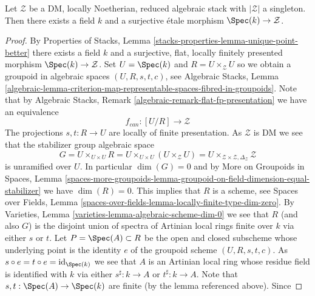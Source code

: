 %
\begin{lemma}
\label{lemma-DM-residual-gerbe}
Let $\mathcal{Z}$ be a DM, locally Noetherian, reduced algebraic stack
with $|\mathcal{Z}|$ a singleton. Then there exists a field $k$ and
a surjective \'etale morphism $\Spec(k) \to \mathcal{Z}$.
\end{lemma}

\begin{proof}
By
Properties of Stacks, Lemma \ref{stacks-properties-lemma-unique-point-better}
there exists a field $k$ and a surjective, flat, locally finitely presented
morphism $\Spec(k) \to \mathcal{Z}$. Set $U = \Spec(k)$ and
$R = U \times_\mathcal{Z} U$ so we obtain a groupoid in algebraic spaces
$(U, R, s, t, c)$, see
Algebraic Stacks, Lemma
\ref{algebraic-lemma-criterion-map-representable-spaces-fibred-in-groupoids}.
Note that by
Algebraic Stacks, Remark \ref{algebraic-remark-flat-fp-presentation}
we have an equivalence
$$
f_{can} : [U/R] \longrightarrow \mathcal{Z}
$$
The projections $s, t : R \to U$ are locally of finite presentation.
As $\mathcal{Z}$ is DM we see that the stabilizer group algebraic space
$$
G = U \times_{U \times U} R = U \times_{U \times U} (U \times_\mathcal{Z} U) =
U \times_{\mathcal{Z} \times \mathcal{Z}, \Delta_\mathcal{Z}} \mathcal{Z}
$$
is unramified over $U$. In particular $\dim(G) = 0$ and by
More on Groupoids in Spaces, Lemma
\ref{spaces-more-groupoids-lemma-groupoid-on-field-dimension-equal-stabilizer}
we have $\dim(R) = 0$. This implies that $R$ is a scheme, see
Spaces over Fields, Lemma
\ref{spaces-over-fields-lemma-locally-finite-type-dim-zero}.
By
Varieties, Lemma \ref{varieties-lemma-algebraic-scheme-dim-0}
we see that $R$ (and also $G$) is the disjoint union of spectra of
Artinian local rings finite over $k$ via either $s$ or $t$. Let
$P = \Spec(A) \subset R$ be the open and
closed subscheme whose underlying point is the identity $e$ of the groupoid
scheme $(U, R, s, t, c)$. As
$s \circ e = t \circ e = \text{id}_{\Spec(k)}$ we see that $A$
is an Artinian local ring whose residue field is identified with $k$
via either $s^\sharp : k \to A$ or $t^\sharp : k \to A$.
Note that $s, t : \Spec(A) \to \Spec(k)$
are finite (by the lemma referenced above). Since

\end{proof}

